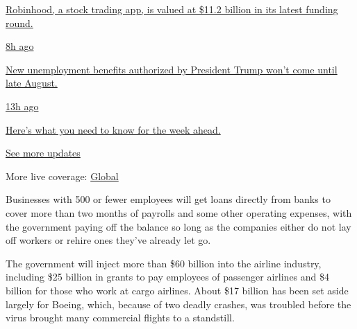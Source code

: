 \href{https://www.nytimes.com/live/2020/08/17/business/stock-market-today-coronavirus?action=click\&pgtype=Article\&state=default\&region=MAIN_CONTENT_1\&context=storylines_live_updates\#robinhood-a-stock-trading-app-is-valued-at-11-2-billion-in-its-latest-funding-round}{Robinhood,
a stock trading app, is valued at \$11.2 billion in its latest funding
round.}

\href{https://www.nytimes.com/live/2020/08/17/business/stock-market-today-coronavirus?action=click\&pgtype=Article\&state=default\&region=MAIN_CONTENT_1\&context=storylines_live_updates\#new-unemployment-benefits-authorized-by-president-trump-wont-come-until-late-august}{8h
ago}

\href{https://www.nytimes.com/live/2020/08/17/business/stock-market-today-coronavirus?action=click\&pgtype=Article\&state=default\&region=MAIN_CONTENT_1\&context=storylines_live_updates\#new-unemployment-benefits-authorized-by-president-trump-wont-come-until-late-august}{New
unemployment benefits authorized by President Trump won't come until
late August.}

\href{https://www.nytimes.com/live/2020/08/17/business/stock-market-today-coronavirus?action=click\&pgtype=Article\&state=default\&region=MAIN_CONTENT_1\&context=storylines_live_updates\#heres-what-you-need-to-know-for-the-week-ahead}{13h
ago}

\href{https://www.nytimes.com/live/2020/08/17/business/stock-market-today-coronavirus?action=click\&pgtype=Article\&state=default\&region=MAIN_CONTENT_1\&context=storylines_live_updates\#heres-what-you-need-to-know-for-the-week-ahead}{Here's
what you need to know for the week ahead.}

\href{https://www.nytimes.com/live/2020/08/17/business/stock-market-today-coronavirus?action=click\&pgtype=Article\&state=default\&region=MAIN_CONTENT_1\&context=storylines_live_updates}{See
more updates}

More live coverage:
\href{https://www.nytimes.com/2020/08/17/world/coronavirus-covid.html?action=click\&pgtype=Article\&state=default\&region=MAIN_CONTENT_1\&context=storylines_live_updates}{Global}

Businesses with 500 or fewer employees will get loans directly from
banks to cover more than two months of payrolls and some other operating
expenses, with the government paying off the balance so long as the
companies either do not lay off workers or rehire ones they've already
let go.

The government will inject more than \$60 billion into the airline
industry, including \$25 billion in grants to pay employees of passenger
airlines and \$4 billion for those who work at cargo airlines. About
\$17 billion has been set aside largely for Boeing, which, because of
two deadly crashes, was troubled before the virus brought many
commercial flights to a standstill.

